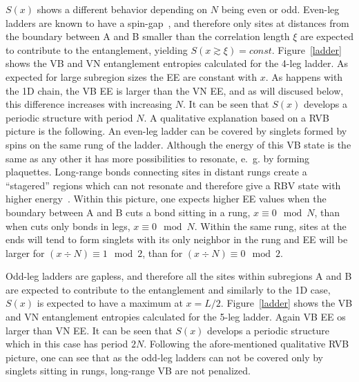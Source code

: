 \documentclass[prl,aps,twocolumn,floatfix,amsmath,amssymb,superscriptaddress,tightenlines]{revtex4}
\begin{document}
$S(x)$ shows a different behavior depending on $N$ being even or odd.
Even-leg ladders are known to have a spin-gap~\cite{White1994}, 
and therefore only sites at distances from the boundary between A and B
smaller than the correlation length $\xi$ are expected to contribute to
the entanglement, yielding $S(x\gtrsim \xi)=const.$ Figure~\ref{ladder}
shows the VB and VN entanglement entropies calculated for the 4-leg
ladder. As expected for large subregion sizes the EE are constant with
$x$. As happens with the 1D chain, the VB EE is larger than the VN EE, and
as will discused below, this difference increases with increasing $N$. It
can be seen that $S(x)$ develops a periodic structure with period $N$. A
qualitative explanation based on a RVB picture is the following. An
even-leg ladder can be covered by singlets formed by spins on the same
rung of the ladder. 
Although the energy of this VB state is the same as any other it has more
possibilities to resonate, e.~g. by forming plaquettes.  Long-range bonds
connecting sites in distant rungs create a ``stagered'' regions which can
not resonate and therefore give a RBV state with higher
energy~\cite{White1994}.  Within this picture, one expects higher EE
values when the boundary between A and B cuts a bond sitting in a rung,
$x\equiv0 \mod{N}$, than when cuts only bonds in legs, $x\equiv0 \mod{N}$.
Within the same rung, sites at the ends will tend to form singlets with
its only neighbor in the rung and EE will be larger for $(x\div N) \equiv
1 \mod{2}$, than for $(x\div N) \equiv 0 \mod{2}$.

Odd-leg ladders are gapless, and therefore all the sites within subregions
A and B are expected to contribute to the entanglement and similarly to
the 1D case, $S(x)$ is expected to have a maximum at $x=L/2$. 
Figure~\ref{ladder} shows the VB and VN entanglement entropies calculated
for the 5-leg ladder. Again VB EE os larger than VN EE. It can be seen
that $S(x)$ develops a periodic structure which in this case has period
$2N$. Following the afore-mentioned qualitative RVB picture, one can see
that as the odd-leg ladders can not be covered only by singlets sitting in
rungs, long-range VB are not penalized. 
\end{document}
